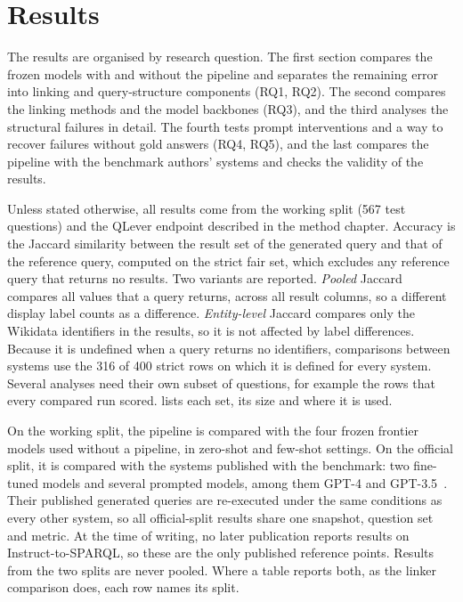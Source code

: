 \chapter{Results}

\label{ch:results}

The results are organised by research question.
The first section compares the frozen models with and without the pipeline and separates the remaining error into linking and query-structure components (RQ1, RQ2).
The second compares the linking methods and the model backbones (RQ3), and the third analyses the structural failures in detail.
The fourth tests prompt interventions and a way to recover failures without gold answers (RQ4, RQ5), and the last compares the pipeline with the benchmark authors' systems and checks the validity of the results.

Unless stated otherwise, all results come from the working split (567 test questions) and the QLever endpoint described in the method chapter.
Accuracy is the Jaccard similarity between the result set of the generated query and that of the reference query, computed on the strict fair set, which excludes any reference query that returns no results.
Two variants are reported.
\emph{Pooled} Jaccard compares all values that a query returns, across all result columns, so a different display label counts as a difference.
\emph{Entity-level} Jaccard compares only the Wikidata identifiers in the results, so it is not affected by label differences.
Because it is undefined when a query returns no identifiers, comparisons between systems use the 316 of 400 strict rows on which it is defined for every system.
Several analyses need their own subset of questions, for example the rows that every compared run scored.
 lists each set, its size and where it is used.

On the working split, the pipeline is compared with the four frozen frontier models used without a pipeline, in zero-shot and few-shot settings.
On the official split, it is compared with the systems published with the benchmark: two fine-tuned models and several prompted models, among them GPT-4 and GPT-3.5~\citep{benamor2025instruct}.
Their published generated queries are re-executed under the same conditions as every other system, so all official-split results share one snapshot, question set and metric.
At the time of writing, no later publication reports results on Instruct-to-SPARQL, so these are the only published reference points.
Results from the two splits are never pooled.
Where a table reports both, as the linker comparison does, each row names its split.


